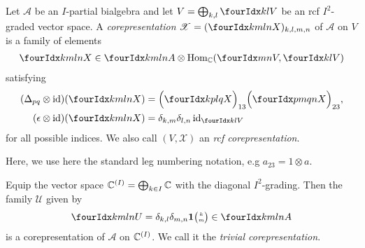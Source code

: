 \begin{Def} \label{definition:corep} Let $\mathscr{A}$ be an
  $I$-partial bialgebra and let $V=\bigoplus_{k,l} \Gru{V}{k}{l}$ be
an rcf $I^{2}$-graded vector space.  A \emph{corepresentation}
  $\mathscr{X}=(\Gr{X}{k}{l}{m}{n})_{k,l,m,n}$ of $\mathscr{A}$ on $V$
  is a family of elements
 \begin{align} \label{eq:rep-blocks}
   \Gr{X}{k}{l}{m}{n} \in \Gr{A}{k}{l}{m}{n} \otimes
  \Hom_\C(\Gru{V}{m}{n},\Gru{V}{k}{l})
 \end{align}
 satisfying 
 \begin{align}
   \label{eq:rep-comultiplication}
    (\Delta_{pq} \otimes
    \id)(\Gr{X}{k}{l}{m}{n}) &=
    \Big{(}\Gr{X}{k}{l}{p}{q}\Big{)}_{13}\Big{(}\Gr{X}{p}{q}{m}{n}\Big{)}_{23},
    \\ \label{eq:rep-counit}
(\epsilon \otimes
  \id)(\Gr{X}{k}{l}{m}{n})&=\delta_{k,m}\delta_{l,n}\id_{\Gru{V}{k}{l}}
 \end{align}
  for all possible indices. We also call $(V,\mathscr{X})$ an
  \emph{rcf corepresentation}.
\end{Def}
Here, we use here the standard leg numbering notation, e.g $a_{23}=1\otimes a$.
\begin{Exa} \label{example:rep-triv} Equip the vector space
  $\mathbb{C}^{(I)}=\bigoplus_{k\in I} \mathbb{C}$ with the diagonal
  $I^{2}$-grading. Then the family $\mathscr{U}$ given by
  \begin{align} \label{eq:rep-triv}
    \Gr{U}{k}{l}{m}{n} = \delta_{k,l}\delta_{m,n} \UnitC{k}{m} \in
    \Gr{A}{k}{l}{m}{n}
  \end{align}
is a corepresentation of $\mathscr{A}$ on $\mathbb{C}^{(I)}$. We call it the
\emph{trivial corepresentation}.
\end{Exa}

